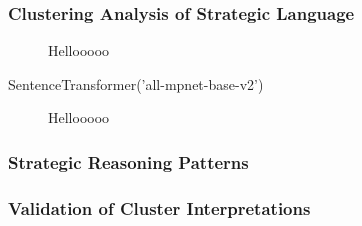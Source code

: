 \subsubsection*{Clustering Analysis of Strategic Language}

\begin{figure}[htpb!]
    \centering
    
    \caption{Hellooooo}
    \label{fig:relative_prevalence_clusters}
\end{figure}

SentenceTransformer('all-mpnet-base-v2')
\begin{figure}[htpb!]
    \centering
    
    \caption{Hellooooo}
    \label{fig:relative_prevalence_clusters}
\end{figure}


\subsubsection*{Strategic Reasoning Patterns}


\subsubsection*{Validation of Cluster Interpretations}





